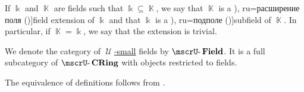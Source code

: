 \begin{definition}
\begin{thmenum}
     If \( \Bbbk \) and \( \BbbK \) are fields such that \( \Bbbk \subseteq \BbbK \), we say that \( \BbbK \) is a \term[bg=разширение на поле (\cite[194]{ГеновМиховскиМоллов1991Алгебра}), ru=расширение поля (\cite[190]{Кострикин2001АлгебраТом3})]{field extension} of \( \Bbbk \) and that \( \Bbbk \) is a \term[bg=подполе (\cite[192]{ГеновМиховскиМоллов1991Алгебра}), ru=подполе (\cite[def. 1.3.3]{Винберг2014Алгебра})]{subfield} of \( \BbbK \). In particular, if \( \BbbK = \Bbbk \), we say that the extension is trivial.

    \mimprovised We denote the category of \hyperref[def:large_and_small_sets]{\( \mscrU \)-small} fields by \( \ucat{Field} \). It is a full subcategory of \hyperref[def:ring/category]{\( \ucat{CRing} \)} with objects restricted to fields.
  \end{thmenum}
\end{definition}
\begin{defproof}
  The equivalence of definitions follows from .
\end{defproof}
